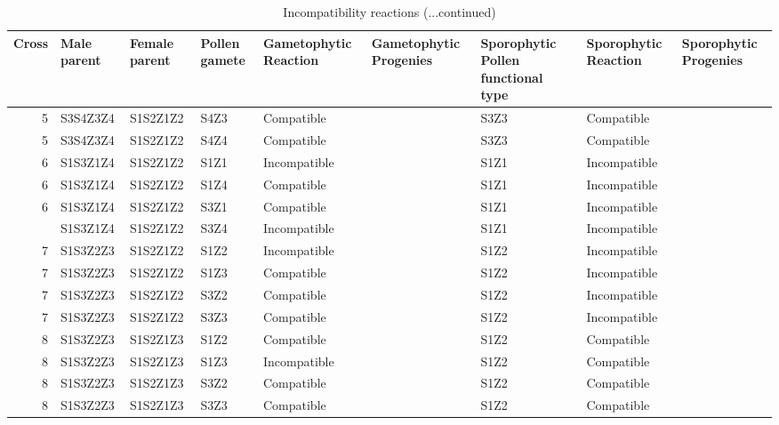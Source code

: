 \documentclass[11pt,ignorenonframetext,aspectratio=169]{beamer}
\begin{document}
\begin{frame}{}
\protect\hypertarget{section-6}{}
\begin{table}

\caption{\label{tab:si-comparison-reaction2}Incompatibility reactions (...continued)}
\centering
\fontsize{6}{8}\selectfont
\begin{tabular}[t]{r>{\raggedright\arraybackslash}p{4em}>{\raggedright\arraybackslash}p{4em}>{\raggedright\arraybackslash}p{4em}>{\raggedright\arraybackslash}p{6em}>{\raggedright\arraybackslash}p{8em}>{\raggedright\arraybackslash}p{8em}>{\raggedright\arraybackslash}p{6em}>{\raggedright\arraybackslash}p{8em}}
\toprule
Cross & Male parent & Female parent & Pollen gamete & Gametophytic Reaction & Gametophytic Progenies & Sporophytic Pollen functional type & Sporophytic Reaction & Sporophytic Progenies\\
\midrule
\rowcolor{gray!6}  5 & S3S4Z3Z4 & S1S2Z1Z2 & S4Z3 & Compatible &  & S3Z3 & Compatible & \\
5 & S3S4Z3Z4 & S1S2Z1Z2 & S4Z4 & Compatible &  & S3Z3 & Compatible & \\
\rowcolor{gray!6}  6 & S1S3Z1Z4 & S1S2Z1Z2 & S1Z1 & Incompatible &  & S1Z1 & Incompatible & \\
6 & S1S3Z1Z4 & S1S2Z1Z2 & S1Z4 & Compatible &  & S1Z1 & Incompatible & \\
\rowcolor{gray!6}  6 & S1S3Z1Z4 & S1S2Z1Z2 & S3Z1 & Compatible &  & S1Z1 & Incompatible & \\
\addlinespace
6 & S1S3Z1Z4 & S1S2Z1Z2 & S3Z4 & Incompatible &  & S1Z1 & Incompatible & \\
\rowcolor{gray!6}  7 & S1S3Z2Z3 & S1S2Z1Z2 & S1Z2 & Incompatible &  & S1Z2 & Incompatible & \\
7 & S1S3Z2Z3 & S1S2Z1Z2 & S1Z3 & Compatible &  & S1Z2 & Incompatible & \\
\rowcolor{gray!6}  7 & S1S3Z2Z3 & S1S2Z1Z2 & S3Z2 & Compatible &  & S1Z2 & Incompatible & \\
7 & S1S3Z2Z3 & S1S2Z1Z2 & S3Z3 & Compatible &  & S1Z2 & Incompatible & \\
\addlinespace
\rowcolor{gray!6}  8 & S1S3Z2Z3 & S1S2Z1Z3 & S1Z2 & Compatible &  & S1Z2 & Compatible & \\
8 & S1S3Z2Z3 & S1S2Z1Z3 & S1Z3 & Incompatible &  & S1Z2 & Compatible & \\
\rowcolor{gray!6}  8 & S1S3Z2Z3 & S1S2Z1Z3 & S3Z2 & Compatible &  & S1Z2 & Compatible & \\
8 & S1S3Z2Z3 & S1S2Z1Z3 & S3Z3 & Compatible &  & S1Z2 & Compatible & \\
\bottomrule
\end{tabular}
\end{table}
\end{frame}
\end{document}
